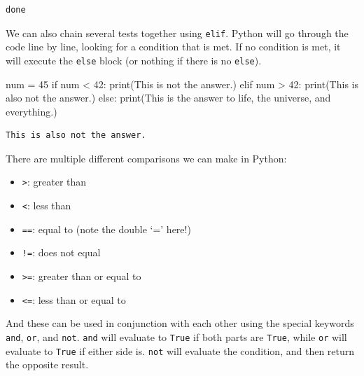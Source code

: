 \documentclass[
  letterpaper,
  DIV=11,
  numbers=noendperiod]{scrreprt}
\newenvironment{Shaded}{\begin{snugshade}}{\end{snugshade}}
\newcommand{\BuiltInTok}[1]{\textcolor[rgb]{0.00,0.23,0.31}{#1}}
\newcommand{\ControlFlowTok}[1]{\textcolor[rgb]{0.00,0.23,0.31}{#1}}
\newcommand{\DecValTok}[1]{\textcolor[rgb]{0.68,0.00,0.00}{#1}}
\newcommand{\NormalTok}[1]{\textcolor[rgb]{0.00,0.23,0.31}{#1}}
\newcommand{\OperatorTok}[1]{\textcolor[rgb]{0.37,0.37,0.37}{#1}}
\newcommand{\StringTok}[1]{\textcolor[rgb]{0.13,0.47,0.30}{#1}}
\providecommand{\tightlist}{%
  \setlength{\itemsep}{0pt}\setlength{\parskip}{0pt}}\usepackage{longtable,booktabs,array}
\begin{document}
\begin{verbatim}
done
\end{verbatim}

We can also chain several tests together using \texttt{elif}. Python
will go through the code line by line, looking for a condition that is
met. If no condition is met, it will execute the \texttt{else} block (or
nothing if there is no \texttt{else}).

\begin{Shaded}
\begin{Highlighting}[]
\NormalTok{num }\OperatorTok{=} \DecValTok{45}
\ControlFlowTok{if}\NormalTok{ num }\OperatorTok{\textless{}} \DecValTok{42}\NormalTok{:}
    \BuiltInTok{print}\NormalTok{(}\StringTok{\textquotesingle{}This is not the answer.\textquotesingle{}}\NormalTok{)}
\ControlFlowTok{elif}\NormalTok{ num }\OperatorTok{\textgreater{}} \DecValTok{42}\NormalTok{:}
    \BuiltInTok{print}\NormalTok{(}\StringTok{\textquotesingle{}This is also not the answer.\textquotesingle{}}\NormalTok{)}
\ControlFlowTok{else}\NormalTok{:}
    \BuiltInTok{print}\NormalTok{(}\StringTok{\textquotesingle{}This is the answer to life, the universe, and everything.\textquotesingle{}}\NormalTok{)}
\end{Highlighting}
\end{Shaded}

\begin{verbatim}
This is also not the answer.
\end{verbatim}

There are multiple different comparisons we can make in Python:

\begin{itemize}
\tightlist
\item
  \texttt{\textgreater{}}: greater than
\item
  \texttt{\textless{}}: less than
\item
  \texttt{==}: equal to (note the double `=' here!)
\item
  \texttt{!=}: does not equal
\item
  \texttt{\textgreater{}=}: greater than or equal to
\item
  \texttt{\textless{}=}: less than or equal to
\end{itemize}

And these can be used in conjunction with each other using the special
keywords \texttt{and}, \texttt{or}, and \texttt{not}. \texttt{and} will
evaluate to \texttt{True} if both parts are \texttt{True}, while
\texttt{or} will evaluate to \texttt{True} if either side is.
\texttt{not} will evaluate the condition, and then return the opposite
result.
\end{document}
